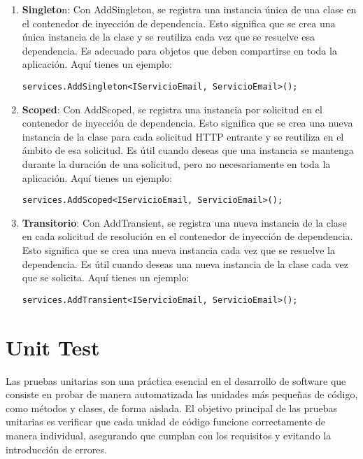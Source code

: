 \documentclass[executivepaper]{article}
\begin{document}
\begin{enumerate}
    \item \textbf{Singleto}n: Con AddSingleton, se registra una instancia única de una clase en el contenedor de inyección de dependencia. Esto significa que se crea una única instancia de la clase y se reutiliza cada vez que se resuelve esa dependencia. Es adecuado para objetos que deben compartirse en toda la aplicación. Aquí tienes un ejemplo:
    \begin{lstlisting}
services.AddSingleton<IServicioEmail, ServicioEmail>();
\end{lstlisting}
    \item \textbf{Scoped}: Con AddScoped, se registra una instancia por solicitud en el contenedor de inyección de dependencia. Esto significa que se crea una nueva instancia de la clase para cada solicitud HTTP entrante y se reutiliza en el ámbito de esa solicitud. Es útil cuando deseas que una instancia se mantenga durante la duración de una solicitud, pero no necesariamente en toda la aplicación. Aquí tienes un ejemplo:
    \begin{lstlisting}
services.AddScoped<IServicioEmail, ServicioEmail>();
\end{lstlisting}
    \item \textbf{Transitorio}: Con AddTransient, se registra una nueva instancia de la clase en cada solicitud de resolución en el contenedor de inyección de dependencia. Esto significa que se crea una nueva instancia cada vez que se resuelve la dependencia. Es útil cuando deseas una nueva instancia de la clase cada vez que se solicita. Aquí tienes un ejemplo:
    \begin{lstlisting}
services.AddTransient<IServicioEmail, ServicioEmail>();
\end{lstlisting}
\end{enumerate}

\section{Unit Test}
Las pruebas unitarias son una práctica esencial en el desarrollo de software que consiste en probar de manera automatizada las unidades más pequeñas de código, como métodos y clases, de forma aislada. El objetivo principal de las pruebas unitarias es verificar que cada unidad de código funcione correctamente de manera individual, asegurando que cumplan con los requisitos y evitando la introducción de errores.
\end{document}
